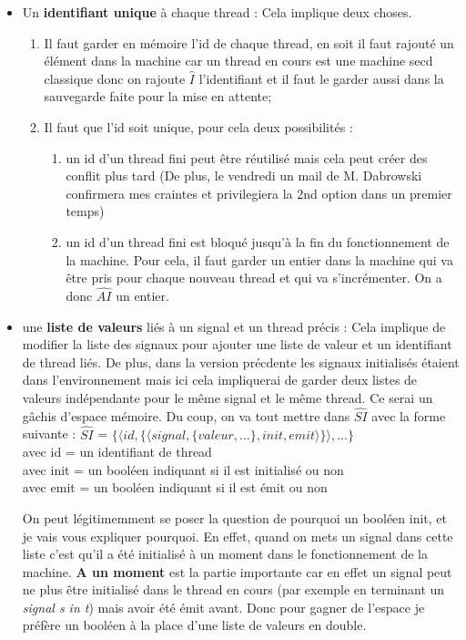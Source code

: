 \documentclass[10pt,a4paper]{article}
\begin{document}
		\begin{itemize}
			\item Un \textbf{identifiant unique} à chaque thread : Cela implique deux choses. 
			\begin{enumerate}
				\item Il faut garder en mémoire l'id de chaque thread, en soit il faut rajouté un élément dans la machine car un thread en cours est une machine secd classique donc on rajoute $\widehat{I}$ l'identifiant et il faut le garder aussi dans la sauvegarde faite pour la mise en attente;
				\item Il faut que l'id soit unique, pour cela deux possibilités : 
				\begin{enumerate}
					\item un id d'un thread fini peut être réutilisé mais cela peut créer des conflit plus tard (De plus, le vendredi un mail de M. Dabrowski confirmera mes craintes et privilegiera la 2nd option dans un premier temps)
					\item un id d'un thread fini est bloqué jusqu'à la fin du fonctionnement de la machine. Pour cela, il faut garder un entier dans la machine qui va être pris pour chaque nouveau thread et qui va s'incrémenter. On a donc $\widehat{AI}$ un entier. 
				\end{enumerate}
			\end{enumerate}
			\item une \textbf{liste de valeurs} liés à un signal et un thread précis : Cela implique de modifier la liste des signaux pour ajouter une liste de valeur et un identifiant de thread liés.
			\smallbreak
			De plus, dans la version précdente les signaux initialisés étaient dans l'environnement mais ici cela impliquerai de garder deux listes de valeurs indépendante pour le même signal et le même thread. Ce serai un gâchis d'espace mémoire. Du coup, on va tout mettre dans $\widehat{SI}$ avec la forme suivante : \smallbreak
			$\widehat{SI}$  = $\{ \langle id , \{\langle signal , \{valeur,...\},init,emit\rangle\}\rangle,...\}$ 
			\\ avec id = un identifiant de thread
			\\ avec init = un booléen indiquant si il est initialisé ou non
			\\ avec emit = un booléen indiquant si il est émit ou non
			\medbreak
			
			On peut légitimemment se poser la question de pourquoi un booléen init, et je vais vous expliquer pourquoi.
			\smallbreak
			En effet, quand on mets un signal dans cette liste c'est qu'il a été initialisé à un moment dans le fonctionnement de la machine. \textbf{A un moment} est la partie importante car en effet un signal peut ne plus être initialisé dans le thread en cours (par exemple en terminant un \textit{signal s in t}) mais avoir été émit avant. Donc pour gagner de l'espace je préfère un booléen à la place d'une liste de valeurs en double.
			

\end{itemize}
\end{document}
